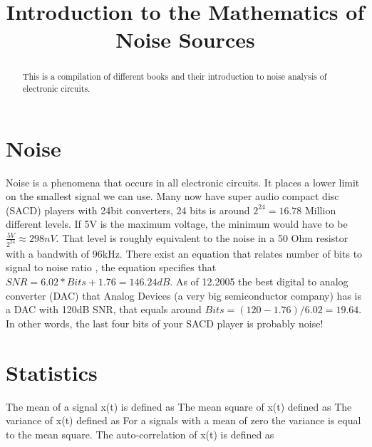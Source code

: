 \documentclass[final,a4paper]{IEEEtran}
\title{Introduction to the Mathematics of Noise Sources}
\begin{document}
\maketitle

\begin{abstract}
This is a compilation of different books \cite{ziel,johns,razavi} and
their introduction to noise analysis of electronic circuits.
\end{abstract}

\section{Noise}
Noise is a phenomena that occurs in all electronic circuits. It
places a lower limit on the smallest signal we can use. Many now have super audio compact disc (SACD)
players with 24bit
converters, 24 bits is around $2^{24} = 16.78$ Million different
levels. If 5V is the maximum voltage, the minimum would have to be
$\frac{5V}{2^{24}} \approx 298nV$. That level is roughly equivalent to the noise in a 50
Ohm resistor with a bandwith of 96kHz. There exist an equation that relates number of bits to
signal to noise ratio \cite{johns}, the equation specifies that $SNR = 6.02*Bits +
1.76 = 146.24dB$. As of 12.2005 the best digital to analog converter (DAC)
that Analog Devices (a very big semiconductor company) has is a DAC
with 120dB SNR, that equals around $Bits = (120-1.76)/6.02 =
19.64$. In other words, the last four bits of your SACD player is probably
noise!

\section{Statistics}

The mean of a signal x(t) is defined as
The mean square of x(t) defined as 
The variance of x(t) defined as
For a signals with a mean of zero the variance is equal to the mean
square.
The auto-correlation of x(t) is defined as
\end{document}
